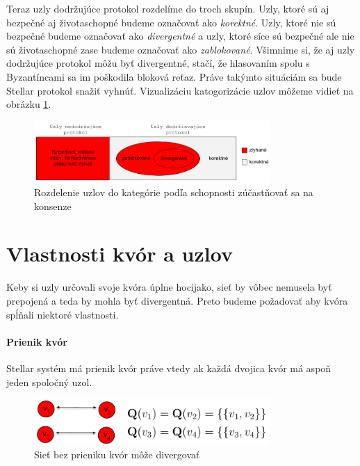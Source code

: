 \vspace{4mm}
Teraz uzly dodržujúce protokol rozdelíme do troch skupín. Uzly, ktoré sú aj
bezpečné aj životaschopné budeme označovať ako \textit{korektné}.
Uzly, ktoré nie sú bezpečné budeme označovať ako \textit{divergentné} a uzly,
ktoré síce sú bezpečné ale nie sú životaschopné zase budeme označovať ako
\textit{zablokované}.
Všimnime si, že aj uzly dodržujúce protokol môžu byť divergentné, stačí, že
hlasovaním spolu s Byzantíncami sa im poškodila bloková reťaz. Práve takýmto
situáciám sa bude Stellar protokol snažiť vyhnúť.
Vizualizáciu katogorizácie uzlov môžeme vidieť na obrázku \ref{obr:typy_uzlov}.

\begin{figure}
\centerline{\includegraphics[width=0.8\textwidth]{images/rozdelenie_uzlov}}
\caption[Kategorizácia uzlov]{Rozdelenie uzlov do kategórie podľa schopnosti
zúčastňovať sa na konsenze} \label{obr:typy_uzlov}
\end{figure}

\section {Vlastnosti kvór a uzlov}

Keby si uzly určovali svoje kvóra úplne hocijako, sieť by vôbec nemusela byť
prepojená a teda by mohla byť divergentná. Preto budeme požadovať aby kvóra
spĺňali niektoré vlastnosti.

\paragraph {Prienik kvór} Stellar systém má prienik kvór práve vtedy ak každá
dvojica kvór má aspoň jeden spoločný uzol.

\begin{figure}
\centerline{\includegraphics[width=0.8\textwidth]{images/prienik_kvor.pdf}}
\caption[Príklad siete bez prieniku kvór]{Sieť bez prieniku kvór môže
divergovať} \label{obr:prienik_kvor} \end{figure}

